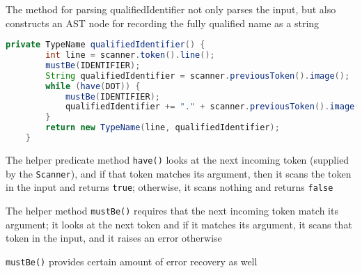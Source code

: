 \documentclass[8pt,a4paper,compress,handout]{beamer}
\begin{document}
\begin{frame}[fragile]
\pause

The method for parsing qualifiedIdentifier not only parses the input, but also constructs an AST node for recording the fully qualified name as a string

\begin{lstlisting}[language=Java]
    private TypeName qualifiedIdentifier() {
        int line = scanner.token().line();
        mustBe(IDENTIFIER);
        String qualifiedIdentifier = scanner.previousToken().image();
        while (have(DOT)) {
            mustBe(IDENTIFIER);
            qualifiedIdentifier += "." + scanner.previousToken().image();
        }
        return new TypeName(line, qualifiedIdentifier);
    }
\end{lstlisting}

\pause
\bigskip

The helper predicate method \lstinline{have()} looks at the next incoming token (supplied by the \lstinline{Scanner}), and if that token matches its argument, then it scans the token in the input and returns \lstinline{true}; otherwise, it scans nothing and returns \lstinline{false}

\pause
\bigskip

The helper method \lstinline{mustBe()} requires that the next incoming token match its argument; it looks at the next token and if it matches its argument, it scans that token in the input, and it raises an error otherwise

\pause
\bigskip

\lstinline{mustBe()} provides certain amount of error recovery as well
\end{frame}
\end{document}
